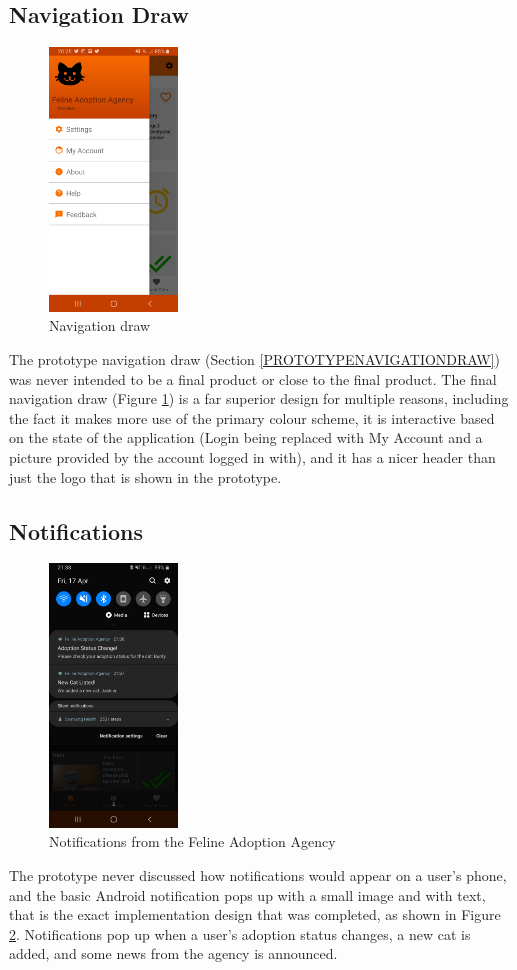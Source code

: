 \subsection{Navigation Draw}

\begin{figure} [htbp!]
    \centering
    \includegraphics[height=7cm]{Images/NavigationScreen.jpg}
    \caption{Navigation draw}
    \label{fig:navigation_draw}
\end{figure}

The prototype navigation draw (Section \ref{PROTOTYPENAVIGATIONDRAW}) was never intended to be a final product or close to the final product. The final navigation draw (Figure \ref{fig:navigation_draw}) is a far superior design for multiple reasons, including the fact it makes more use of the primary colour scheme, it is interactive based on the state of the application (Login being replaced with My Account and a picture provided by the account logged in with), and it has a nicer header than just the logo that is shown in the prototype.

\subsection{Notifications}

\begin{figure} [htbp!]
    \centering
    \includegraphics[height=7cm]{Images/Notifications.jpg}
    \caption{Notifications from the Feline Adoption Agency}
    \label{fig:notifications}
\end{figure}
The prototype never discussed how notifications would appear on a user's phone, and the basic Android notification pops up with a small image and with text,
 that is the exact implementation design that was completed, as shown in Figure \ref{fig:notifications}. Notifications pop up when a user's adoption status changes, a new cat is added, and some news from the agency is announced.

